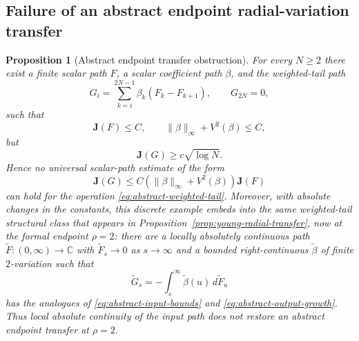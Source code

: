 \documentclass[11pt]{article}
\numberwithin{equation}{section}
\newtheorem{proposition}[theorem]{Proposition}
\theoremstyle{remark}
\theoremstyle{definition}
\begin{document}
\subsection{Failure of an abstract endpoint radial-variation transfer}

\begin{proposition}[Abstract endpoint transfer obstruction]
\label{prop:abstract-radial-v2-counterexample}
For every $N\ge2$ there exist a finite scalar path $F$, a scalar coefficient
path $\beta$, and the weighted-tail path
\begin{equation}\label{eq:abstract-weighted-tail}
 G_i=\sum_{k=i}^{2N-1}\beta_k(F_k-F_{k+1}),\qquad G_{2N}=0,
\end{equation}
such that
\begin{equation}\label{eq:abstract-input-bounds}
 \mathbf J(F)\le C,
 \qquad \|\beta\|_\infty+V^2(\beta)\le C,
\end{equation}
but
\begin{equation}\label{eq:abstract-output-growth}
 \mathbf J(G)\ge c\sqrt{\log N}.
\end{equation}
Hence no universal scalar-path estimate of the form
\[
 \mathbf J(G)\le C(\|\beta\|_\infty+V^2(\beta))\mathbf J(F)
\]
can hold for the operation \eqref{eq:abstract-weighted-tail}.
Moreover, with absolute changes in the constants, this discrete example
embeds into the same weighted-tail structural class that appears in
Proposition~\ref{prop:young-radial-transfer}, now at the formal endpoint
$\rho=2$:
there are a locally absolutely continuous path
$\widetilde F:(0,\infty)\to\mathbb C$ with
$\widetilde F_s\to0$ as $s\to\infty$ and a bounded right-continuous
$\widetilde\beta$ of finite $2$-variation such that
\[
 \widetilde G_s=-\int_s^\infty \widetilde\beta(u)\,d\widetilde F_u
\]
has the analogues of \eqref{eq:abstract-input-bounds} and
\eqref{eq:abstract-output-growth}.  Thus local absolute continuity of the
input path does not restore an abstract endpoint transfer at $\rho=2$.
\end{proposition}
\end{document}
